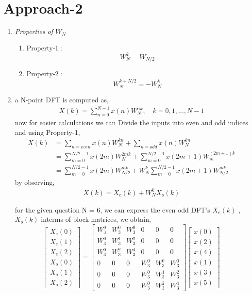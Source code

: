 \documentclass[journal,12pt,twocolumn]{IEEEtran}
\renewcommand\thesection{\arabic{section}}
\begin{document}
\section{Approach-2}
\begin{enumerate}[label=\thesection.\arabic*.,ref=\thesection.\theenumi]
\item \emph{Properties of $W_{N}$}
\begin{enumerate}
\item Property-1 : \[ W^{2}_{N} =  W_{N/2} \]  
\item Property-2 : \[ W^{k+N/2}_{N} = - W^{k}_{N} \]
\end{enumerate}
\item  a N-point DFT is computed as,
    \begin{align}
        X(k) = \sum_{n=0}^{N-1} x(n)W^{nk}_{N}, \quad k=0,1, \ldots, N-1
    \end{align}
now for easier calculations we can Divide the inputs into even and odd indices and using Property-1,
    \begin{align}
       X(k) &= \sum_{n=even} x(n)W^{kn}_{N} + \sum_{n=odd} x(n)W^{kn}_{N} \\
       &= \sum_{m=0}^{N/2 -1} x(2m)W^{2mk}_{N} + \sum_{m=0}^{N/2 -1} x(2m+1)W^{(2m+1)k}_{N} \\
       &= \sum_{m=0}^{N/2 -1} x(2m)W^{mk}_{N/2} + W^{k}_{N} \sum_{m=0}^{N/2 -1} x(2m+1)W^{mk}_{N/2} 
    \end{align}
by observing,
\begin{align}
X(k) = {X_{e}(k)}+ W_{N}^k{X_{o}(k)}
\label{eq:equation3}
\end{align}

    
for the given question  N = 6, we can express the even odd DFT's $X_{e}(k)$ , $X_{o}(k)$ interms of block  matrices, we obtain,
\begin{equation}
\begin{bmatrix}
X_{e}(0) \\ 
X_{e}(1) \\ 
X_{e}(2) \\ 
X_{o}(0) \\ 
X_{o}(1) \\ 
X_{o}(2)
\end{bmatrix}
=
\begin{bmatrix}
W^{0}_{3} & W^{0}_{3} & W^{0}_{3} & 0 & 0 & 0\\
W^{0}_{3} & W^{1}_{3} & W^{2}_{3} & 0 & 0 & 0\\
W^{0}_{3} & W^{2}_{3} & W^{4}_{3} & 0 & 0 & 0\\
0 & 0 & 0 & W^{0}_{3} & W^{0}_{3} & W^{0}_{3}\\
0 & 0 & 0 & W^{0}_{3} & W^{1}_{3} & W^{2}_{3}\\
0 & 0 & 0 & W^{0}_{3} & W^{2}_{3} & W^{4}_{3}
\end{bmatrix}
\begin{bmatrix}
x(0) \\ 
x(2) \\ 
x(4) \\ 
x(1) \\ 
x(3) \\ 
x(5) 
\end{bmatrix}   
\end{equation}
    

\end{enumerate}
\end{document}

